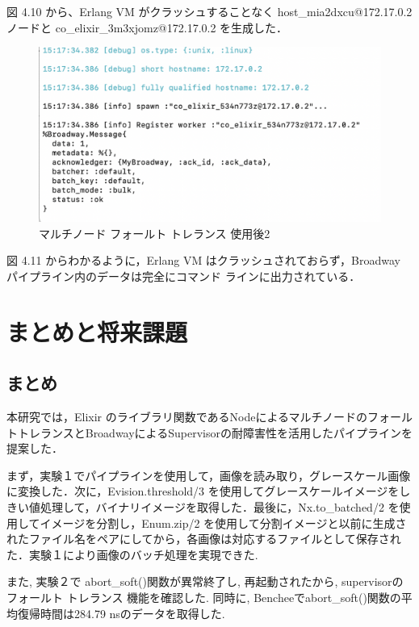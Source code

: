 \documentclass[a4paper]{jreport}	%
\begin{document}
図 4.10 から、Erlang VM がクラッシュすることなく host\_mia2dxcu@172.17.0.2 ノードと co\_elixir\_3m3xjomz@172.17.0.2 を生成した．

\begin{figure}[H]
\vspace{4cm}
\begin{center}
\hspace{-8cm}
\includegraphics[scale=0.5]{ja/f13.png}
\end{center}
\caption{マルチノード フォールト トレランス 使用後2}
\end{figure}

図 4.11 からわかるように，Erlang VM はクラッシュされておらず，Broadway パイプライン内のデータは完全にコマンド ラインに出力されている．




\chapter{まとめと将来課題}
\section{まとめ}
本研究では，Elixir のライブラリ関数であるNodeによるマルチノードのフォールトトレランスとBroadwayによるSupervisorの耐障害性を活用したパイプラインを提案した．

まず，実験１でパイプラインを使用して，画像を読み取り，グレースケール画像に変換した．次に，Evision.threshold/3 を使用してグレースケールイメージをしきい値処理して，バイナリイメージを取得した．最後に，Nx.to\_batched/2 を使用してイメージを分割し，Enum.zip/2 を使用して分割イメージと以前に生成されたファイル名をペアにしてから，各画像は対応するファイルとして保存された．実験１により画像のバッチ処理を実現できた.

また, 実験２で abort\_soft()関数が異常終了し, 再起動されたから, supervisorのフォールト トレランス 機能を確認した. 同時に, Bencheeでabort\_soft()関数の平均復帰時間は284.79 nsのデータを取得した. 
\end{document}
